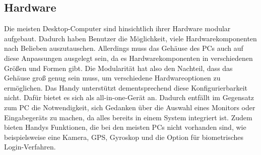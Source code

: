\subsection{Hardware}
Die meisten Desktop-Computer sind hinsichtlich ihrer Hardware modular aufgebaut. %
	Dadurch haben Benutzer die Möglichkeit, viele Hardwarekomponenten nach Belieben auszutauschen. %
	Allerdings muss das Gehäuse des PCs auch auf diese Anpassungen ausgelegt sein, da es Hardwarekomponenten in verschiedenen Größen und Formen gibt. Die Modularität hat also den Nachteil, dass das Gehäuse groß genug sein muss, um verschiedene Hardwareoptionen zu ermöglichen.\newline%
Das Handy unterstützt dementsprechend diese Konfigurierbarkeit nicht. Dafür bietet es sich als all-in-one-Gerät an. %
	Dadurch entfällt im Gegensatz zum PC die Notwendigkeit, sich Gedanken über die Auswahl eines Monitors oder Eingabegeräts zu machen, da alles bereits in einem System integriert ist. Zudem bieten Handys Funktionen, die bei den meisten PCs nicht vorhanden sind, wie beispielsweise eine Kamera, GPS, Gyroskop und die Option für biometrisches Login-Verfahren.\newline%
%
%
% 
%
%	
%	
%	
%
%
